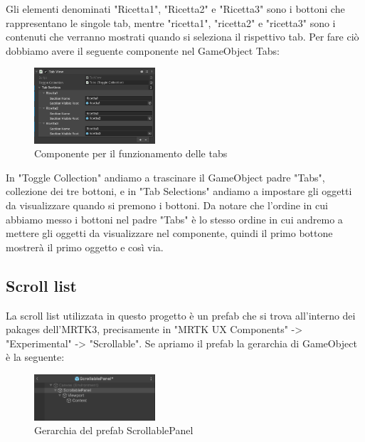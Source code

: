 Gli elementi denominati "Ricetta1", "Ricetta2" e "Ricetta3" sono i bottoni che rappresentano le singole tab, mentre "ricetta1", "ricetta2" e "ricetta3" sono i contenuti che verranno mostrati quando si seleziona il rispettivo tab. Per fare ciò dobbiamo avere il seguente componente nel GameObject Tabs:

\begin{figure}[H]
    \centering
    \includegraphics[width=0.4\textwidth,height=\textheight,keepaspectratio]{figures/chapter_1/componente-tabs.png}
    \caption{Componente per il funzionamento delle tabs}
\end{figure}

 In "Toggle Collection" andiamo a trascinare il GameObject padre "Tabs", collezione dei tre bottoni, e in "Tab Selections" andiamo a impostare gli oggetti da visualizzare quando si premono i bottoni. Da notare che l'ordine in cui abbiamo messo i bottoni nel padre "Tabs" è lo stesso ordine in cui andremo a mettere gli oggetti da visualizzare nel componente, quindi il primo bottone mostrerà il primo oggetto e così via. \cite{MRTKtabs}

\subsection{Scroll list}
La scroll list utilizzata in questo progetto è un prefab che si trova all'interno dei pakages dell'MRTK3, precisamente in "MRTK UX Components" -> "Experimental" -> "Scrollable". Se apriamo il prefab la gerarchia di GameObject è la seguente:

\begin{figure}[H]
    \centering
    \includegraphics[width=0.4\textwidth,height=\textheight,keepaspectratio]{figures/chapter_1/GerarchiascrollPanel.png}
    \caption{Gerarchia del prefab ScrollablePanel}
\end{figure}

